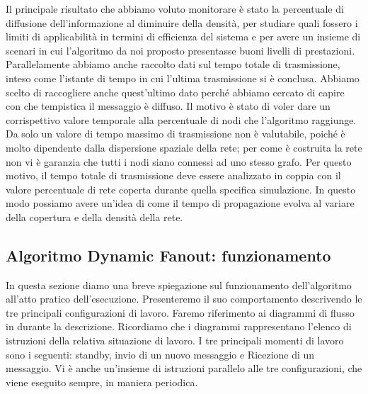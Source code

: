 Il principale risultato che abbiamo voluto monitorare è stato la percentuale di diffusione dell'informazione al diminuire della densità, per studiare quali fossero i limiti di applicabilità in termini di efficienza del sistema e per avere un insieme di scenari in cui l'algoritmo da noi proposto presentasse buoni livelli di prestazioni. Parallelamente abbiamo anche raccolto dati sul tempo totale di trasmissione, inteso come l'istante di tempo in cui l'ultima trasmissione si è conclusa. Abbiamo scelto di raccogliere anche quest'ultimo dato perché abbiamo cercato di capire con che tempistica il messaggio è diffuso. Il motivo è stato di voler dare un corrispettivo valore temporale alla percentuale di nodi che l'algoritmo raggiunge. Da solo un valore di tempo massimo di trasmissione non è valutabile, poiché è molto dipendente dalla dispersione spaziale della rete; per come è costruita la rete non vi è garanzia che tutti i nodi siano connessi ad uno stesso grafo. Per questo motivo, il tempo totale di trasmissione deve essere analizzato in coppia con il valore percentuale di rete coperta durante quella specifica simulazione. In questo modo possiamo avere un'idea di come il tempo di propagazione evolva al variare della copertura e della densità della rete.
\bigskip

\subsection{Algoritmo Dynamic Fanout: funzionamento}
In questa sezione diamo una breve spiegazione sul funzionamento dell'algoritmo all'atto pratico dell'esecuzione. Presenteremo il suo comportamento descrivendo le tre principali configurazioni di lavoro. Faremo riferimento ai diagrammi di flusso in  durante la descrizione. Ricordiamo che i diagrammi rappresentano l'elenco di istruzioni della relativa situazione di lavoro. I tre principali momenti di lavoro sono i seguenti: standby, invio di un nuovo messaggio e Ricezione di un messaggio. Vi è anche un'insieme di istruzioni parallelo alle tre configurazioni, che viene eseguito sempre, in maniera periodica.
\bigskip


